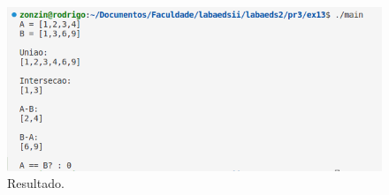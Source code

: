 \begin{figure}[h!]
	\centering
	\includegraphics[width=0.7\linewidth]{ex13_saida}
	\caption{Resultado.}
	\label{fig:ex13saida}
\end{figure}










